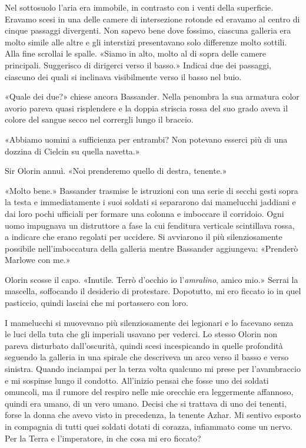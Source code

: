 Nel sottosuolo l'aria era immobile, in contrasto con i venti della
superficie. Eravamo scesi in una delle camere di intersezione {rotonde}
ed eravamo al centro di cinque passaggi divergenti. Non sapevo bene dove
fossimo, ciascuna galleria era molto simile alle altre e gli interstizi
presentavano solo differenze molto sottili. Alla fine scrollai le
spalle. «Siamo in alto, molto al di sopra delle camere principali.
Suggerisco di dirigerci verso il basso.» Indicai due dei passaggi,
ciascuno dei quali si inclinava visibilmente verso il basso nel buio.

«Quale dei due?» chiese ancora Bassander. Nella penombra la sua armatura
color avorio pareva quasi risplendere e la doppia striscia rossa del suo
grado aveva il colore del sangue secco nel corrergli lungo il braccio.

«Abbiamo uomini a sufficienza per entrambi? Non potevano esserci più di
una dozzina di Cielcin su quella navetta.»

Sir Olorin annuì. «Noi prenderemo quello di destra, tenente.»

«Molto bene.» Bassander trasmise le istruzioni con una serie di secchi
gesti sopra la testa e immediatamente i suoi soldati si separarono dai
mamelucchi jaddiani e dai loro pochi ufficiali per formare una colonna e
imboccare il corridoio. Ogni uomo impugnava un distruttore a fase la cui
fenditura verticale scintillava rossa, a indicare che erano regolati per
uccidere. Si avviarono il più silenziosamente possibile nell'imboccatura
della galleria mentre Bassander aggiungeva: «Prenderò Marlowe con me.»

Olorin scosse il capo. «Inutile. Terrò d'occhio io l'\emph{amralino},
amico mio.» Serrai la mascella, soffocando il desiderio di protestare.
Dopotutto, mi ero ficcato io in quel pasticcio, quindi lasciai che mi
portassero con loro.

I mamelucchi si muovevano più silenziosamente dei legionari e lo
facevano senza le luci della tuta che gli imperiali usavano per vederci.
Lo stesso Olorin non pareva disturbato dall'oscurità, quindi scesi
incespicando in quelle profondità seguendo la galleria in una spirale
che descriveva un arco verso il basso e verso sinistra. Quando inciampai
per la terza volta qualcuno mi prese per l'avambraccio e mi sospinse
lungo il condotto. All'inizio pensai che fosse uno dei soldati omuncoli,
ma il rumore del respiro nelle mie orecchie era leggermente affannoso,
quindi era umano, di un vero umano. Decisi che si trattava di uno dei
tenenti, forse la donna che avevo visto in precedenza, la tenente Azhar.
Mi {sentivo} esposto in compagnia di tutti quei soldati dotati di
corazza, infiammato come un nervo. Per la Terra e l'imperatore, in che
cosa mi ero ficcato?

